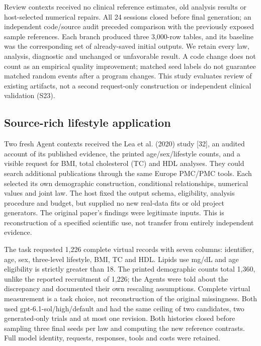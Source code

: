 \documentclass[11pt,letterpaper]{article}
\begin{document}
Review contexts received no clinical reference estimates, old analysis results or host-selected numerical repairs. All 24 sessions closed before final generation; an independent code/\allowbreak{}source audit preceded comparison with the previously exposed sample references. Each branch produced three 3,000-row tables, and its baseline was the corresponding set of already-saved initial outputs. We retain every law, analysis, diagnostic and unchanged or unfavorable result. A code change does not count as an empirical quality improvement; matched seed labels do not guarantee matched random events after a program changes. This study evaluates review of existing artifacts, not a second request-only construction or independent clinical validation (S23).


\subsection{Source-rich lifestyle application}

Two fresh Agent contexts received the Lea et al. (2020) study [32], an audited account of its published evidence, the printed age/\allowbreak{}sex/\allowbreak{}lifestyle counts, and a visible request for BMI, total cholesterol (TC) and HDL analyses. They could search additional publications through the same Europe PMC/\allowbreak{}PMC tools. Each selected its own demographic construction, conditional relationships, numerical values and joint law. The host fixed the output schema, eligibility, analysis procedure and budget, but supplied no new real-data fits or old project generators. The original paper's findings were legitimate inputs. This is reconstruction of a specified scientific use, not transfer from entirely independent evidence.


The task requested 1,226 complete virtual records with seven columns: identifier, age, sex, three-level lifestyle, BMI, TC and HDL. Lipids use mg/\allowbreak{}dL and age eligibility is strictly greater than 18. The printed demographic counts total 1,360, unlike the reported recruitment of 1,226; the Agents were told about the discrepancy and documented their own rescaling assumptions. Complete virtual measurement is a task choice, not reconstruction of the original missingness. Both used gpt-6.1-sol/\allowbreak{}high/\allowbreak{}default and had the same ceiling of two candidates, two generated-only trials and at most one revision. Both histories closed before sampling three final seeds per law and computing the new reference contrasts. Full model identity, requests, responses, tools and costs were retained.
\end{document}
